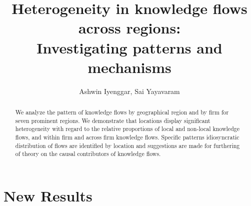 \documentclass[12pt]{article}
\begin{document}
\title{Heterogeneity in knowledge flows across regions:\\  Investigating patterns and mechanisms}
\author{Ashwin Iyenggar, Sai Yayavaram} 

\maketitle
\thispagestyle{empty}

\begin{abstract}
\noindent We analyze the pattern of knowledge flows by geographical region and by firm for seven prominent regions. We demonstrate that locations display significant heterogeneity with regard to the relative proportions of local and non-local knowledge flows, and within firm and across firm knowledge flows. Specific patterns idiosyncratic distribution of flows are identified by location and suggestions are made for furthering of theory on the causal contributors of knowledge flows.
\end{abstract}

\doublespacing

\newpage

\section{New Results}
\begin{center}
\begin{spacing}{0.9}

\end{spacing}
\end{center}

\newpage
\end{document}
